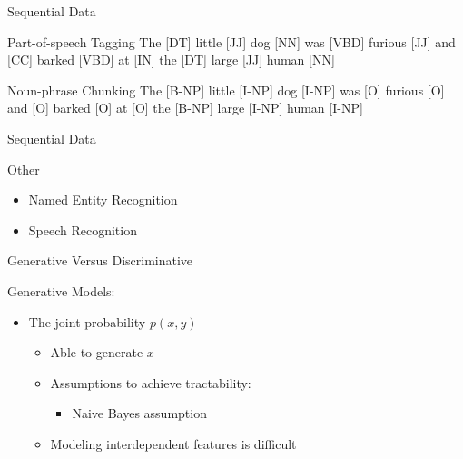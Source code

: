 \documentclass[presentation,bigger]{beamer}
\begin{document}
\begin{frame}[label={sec:orgheadline2}]{Sequential Data}
\begin{block}{Part-of-speech Tagging}
The \alert{[DT]} little \alert{[JJ]} dog \alert{[NN]} was \alert{[VBD]} furious \alert{[JJ]} and \alert{[CC]} barked \alert{[VBD]} at \alert{[IN]} the \alert{[DT]} large \alert{[JJ]} human \alert{[NN]}
\end{block}
\begin{block}{Noun-phrase Chunking}
The \alert{[B-NP]} little \alert{[I-NP]} dog \alert{[I-NP]} was \alert{[O]} furious \alert{[O]} and \alert{[O]} barked \alert{[O]} at \alert{[O]} the \alert{[B-NP]} large \alert{[I-NP]} human \alert{[I-NP]}
\end{block}
\end{frame}
\begin{frame}[label={sec:orgheadline3}]{Sequential Data}
\begin{block}{Other}
\begin{itemize}
\item Named Entity Recognition
\item Speech Recognition
\end{itemize}
\end{block}
\end{frame}
\begin{frame}[label={sec:orgheadline4}]{Generative Versus Discriminative}
\begin{block}{Generative Models:}
\begin{itemize}
\item The joint probability \(p(x,y)\)
\begin{itemize}
\item Able to generate \(x\)
\item Assumptions to achieve tractability:
\begin{itemize}
\item Naive Bayes assumption
\end{itemize}
\item Modeling interdependent features is difficult
\end{itemize}
\end{itemize}
\end{block}
\end{frame}
\end{document}
